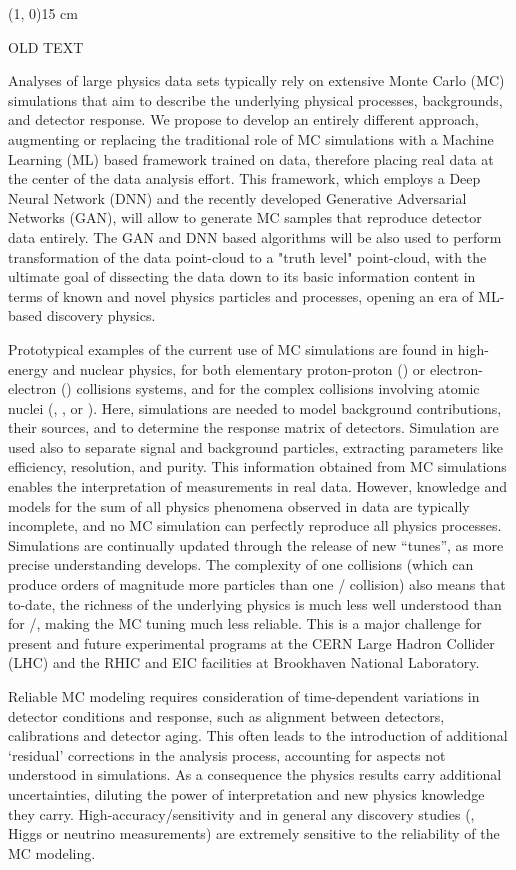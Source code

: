 \line(1, 0){15 cm}

OLD TEXT

Analyses of large physics data sets typically rely on extensive Monte Carlo (MC) simulations that aim to describe the underlying physical processes, backgrounds, and detector response. We propose to develop an entirely different  approach, augmenting or replacing the traditional role of MC simulations with a Machine Learning (ML) based framework trained on data, therefore placing real data at the center of the data analysis effort. This framework, which employs a Deep Neural Network (DNN) and the recently developed Generative Adversarial Networks (GAN), will allow to generate MC samples that reproduce detector data entirely. The GAN and DNN based algorithms will be also used to perform transformation of the data point-cloud to a "truth level" point-cloud, with the ultimate goal of dissecting the data down to its basic information content in terms of known and novel physics particles and processes, opening an era of ML-based discovery physics.

Prototypical examples of the current use of MC simulations are found in high-energy and nuclear physics, for both elementary proton-proton (\pp) or electron-electron (\eecol) collisions systems, and for the complex collisions involving atomic nuclei (\eA, \pA, or \aacol). Here, simulations are needed to model background contributions, their sources, and to determine the response matrix of detectors. Simulation are used also to separate signal and background particles, extracting parameters like efficiency, resolution, and purity. This information obtained from MC simulations enables the interpretation of  measurements in real data. However, knowledge and models for the sum of all physics phenomena observed in data are typically incomplete, and no MC simulation can perfectly reproduce all physics processes. Simulations are continually updated through the release of new ``tunes'', as more precise understanding develops. The complexity of one {\aacol} collisions (which can produce orders of magnitude more particles than one \eecol/{\pp} collision) also means that to-date, the richness of the underlying physics is much less well understood than for \eecol/{\pp}, making the MC tuning much less reliable. This is a major challenge for present and future experimental programs at the CERN Large Hadron Collider (LHC) and the RHIC and EIC facilities at Brookhaven National Laboratory.

Reliable MC modeling requires consideration of time-dependent variations in detector conditions and response, such as alignment between detectors, calibrations and detector aging. This often leads to the introduction of additional `residual' corrections in the analysis process, accounting for aspects not understood in simulations. As a consequence the physics results carry additional uncertainties, diluting the power of interpretation and new physics knowledge they carry. High-accuracy/sensitivity and in general any discovery studies (\eg, Higgs or neutrino measurements) are extremely sensitive to the reliability of the MC modeling.

